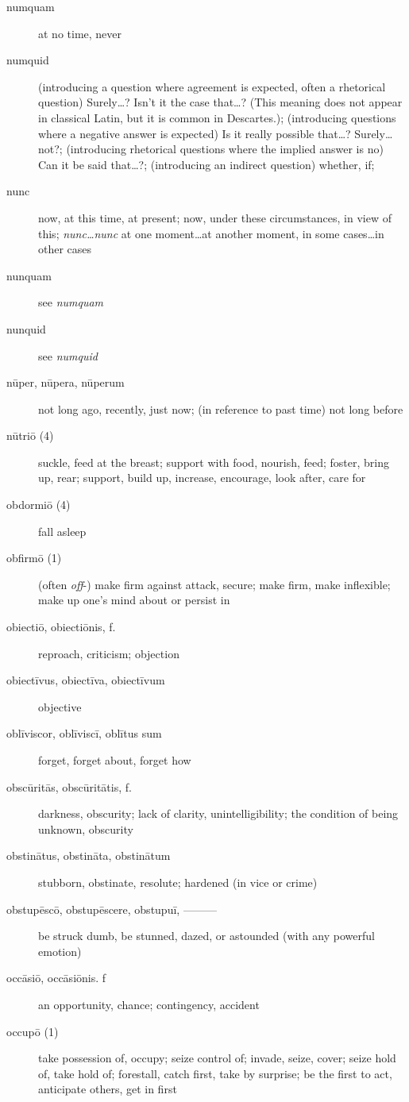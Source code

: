 \begin{description}
    \item[numquam] \marginnote{*}at no time, never
    \item[numquid]  (introducing a question where agreement is expected, often a rhetorical question) Surely\dots ? Isn't it the case that\dots ? (This meaning does not appear in classical Latin, but it is common in Descartes.); (introducing questions where a negative answer is expected) Is it really possible that\dots ? Surely\dots not?; (introducing rhetorical questions where the implied answer is no) Can it be said that\dots ?; (introducing an indirect question) whether, if;
    \item[nunc] \marginnote{*}now, at this time, at present; now, under these circumstances, in view of this; \textit{nunc\dots nunc} at one moment\dots at another moment, in some cases\dots in other cases
    \item[nunquam] see \textit{numquam}
    \item[nunquid] see \textit{numquid}
    \item[nūper, nūpera, nūperum] not long ago, recently, just now; (in reference to past time) not long before
    \item[nūtriō (4)] suckle, feed at the breast; support with food, nourish, feed; foster, bring up, rear; support, build up, increase, encourage, look after, care for
    \item[obdormiō (4)] fall asleep
    \item[obfirmō (1)] (often \textit{off}-) make firm against attack, secure; make firm, make inflexible; make up one's mind about or persist in
    \item[obiectiō, obiectiōnis, f.] reproach, criticism; objection
    \item[obiectīvus, obiectīva, obiectīvum] objective
    \item[oblīviscor, oblīviscī, oblītus sum] forget, forget about, forget how
    \item[obscūritās, obscūritātis, f.] darkness, obscurity; lack of clarity, unintelligibility; the condition of being unknown, obscurity
    \item[obstinātus, obstināta, obstinātum] stubborn, obstinate, resolute; hardened (in vice or crime)
    \item[obstupēscō, obstupēscere, obstupuī, ———] be struck dumb, be stunned, dazed, or astounded (with any powerful emotion)
    \item[occāsiō, occāsiōnis. f] an opportunity, chance; contingency, accident
    \item[occupō (1)] \marginnote{*}take possession of, occupy; seize control of; invade, seize, cover; seize hold of, take hold of; forestall, catch first, take by surprise; be the first to act, anticipate others, get in first

\end{description}
